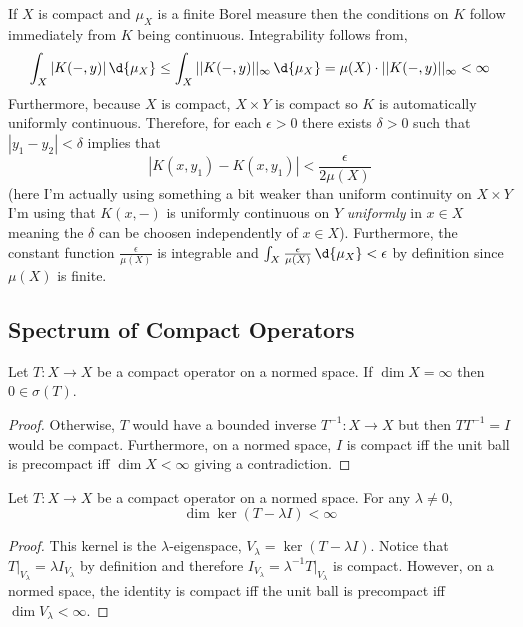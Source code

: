 \documentclass[12pt]{article}
\begin{document}
\begin{rmk}
If $X$ is compact and $\mu_X$ is a finite Borel measure then the conditions on $K$ follow immediately from $K$ being continuous. Integrability follows from,
\[ \int_X |K(-,y)| \, \d{\mu_X} \le \int_X || K(-,y) ||_\infty \, \d{\mu_X} = \mu(X) \cdot || K(-,y) ||_\infty < \infty \]
Furthermore, because $X$ is compact, $X \times Y$ is compact so $K$ is automatically uniformly continuous. Therefore, for each $\epsilon > 0$ there exists $\delta > 0$ such that $|y_1 - y_2| < \delta$ implies that
\[ |K(x, y_1) - K(x, y_1)| < \frac{\epsilon}{2\mu(X)} \] (here I'm actually using something a bit weaker than uniform continuity on $X \times Y$ I'm using that $K(x,-)$ is uniformly continuous on $Y$ \textit{uniformly} in $x \in X$ meaning the $\delta$ can be choosen independently of $x \in X$).
Furthermore, the constant function $\frac{\epsilon}{\mu(X)}$ is integrable and $\int_X \frac{\epsilon}{\mu(X)} \, \d{\mu_X} < \epsilon$ by definition since $\mu(X)$ is finite.
\end{rmk}

\subsection{Spectrum of Compact Operators}

\begin{prop}
Let $T : X \to X$ be a compact operator on a normed space. If $\dim{X} = \infty$ then $0 \in \sigma(T)$.
\end{prop}

\begin{proof}
Otherwise, $T$ would have a bounded inverse $T^{-1} : X \to X$ but then $T T^{-1} = I$ would be compact. Furthermore, on a normed space, $I$ is compact iff the unit ball is precompact iff $\dim{X} < \infty$ giving a contradiction.
\end{proof}

\begin{prop}
Let $T : X \to X$ be a compact operator on a normed space. For any $\lambda \neq 0$,
\[ \dim{\ker{(T - \lambda I)}} < \infty \]
\end{prop}

\begin{proof}
This kernel is the $\lambda$-eigenspace, $V_\lambda = \ker{(T - \lambda I)}$. Notice that $T|_{V_\lambda} = \lambda I_{V_\lambda}$ by definition and therefore $I_{V_{\lambda}} = \lambda^{-1} T|_{V_\lambda}$ is compact. However, on a normed space, the identity is compact iff the unit ball is precompact iff $\dim{V_\lambda} < \infty$.
\end{proof}
\end{document}
